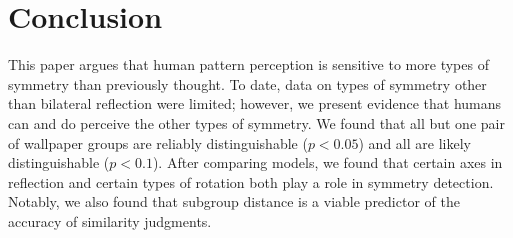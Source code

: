 \section{Conclusion}
This paper argues that human pattern perception is sensitive to more types of symmetry than previously thought. To date, data on types of symmetry other than bilateral reflection were limited; however, we present evidence that humans can and do perceive the other types of symmetry. We found that all but one pair of wallpaper groups are reliably distinguishable ($p < 0.05$) and all are likely distinguishable ($p < 0.1$). After comparing models, we found that certain axes in reflection and certain types of rotation both play a role in symmetry detection. Notably, we also found that subgroup distance is a viable predictor of the accuracy of similarity judgments.